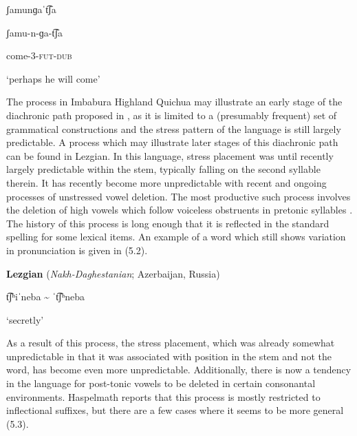 ʃamunɡaˈt͡ʃa



ʃamu{}-n{}-ɡa{}-t͡ʃa



come-3-\textsc{fut-dub}



‘perhaps he will come’



\citep[209]{Cole1982}


\z

  The process in Imbabura Highland Quichua may illustrate an early stage of the diachronic path proposed in \citet{BybeeEtAl1998}, as it is limited to a (presumably frequent) set of grammatical constructions and the stress pattern of the language is still largely predictable. A process which may illustrate later stages of this diachronic path can be found in Lezgian. In this language, stress placement was until recently largely predictable within the stem, typically falling on the second syllable therein. It has recently become more unpredictable with recent and ongoing processes of unstressed vowel deletion. The most productive such process involves the deletion of high vowels which follow voiceless obstruents in pretonic syllables \citep[36]{Haspelmath1993}. The history of this process is long enough that it is reflected in the standard spelling for some lexical items. An example of a word which still shows variation in pronunciation is given in (5.2).



\ea\label{ex:(5.2)}
  \textbf{Lezgian} (\textit{Nakh-Daghestanian}; Azerbaijan, Russia)



t͡ʃʰiˈneba {\textasciitilde} ˈt͡ʃʰneba



‘secretly’



\citep[38]{Haspelmath1993}


\z

As a result of this process, the stress placement, which was already somewhat unpredictable in that it was associated with position in the stem and not the word, has become even more unpredictable. Additionally, there is now a tendency in the language for post-tonic vowels to be deleted in certain consonantal environments. Haspelmath reports that this process is mostly restricted to inflectional suffixes, but there are a few cases where it seems to be more general (5.3).



